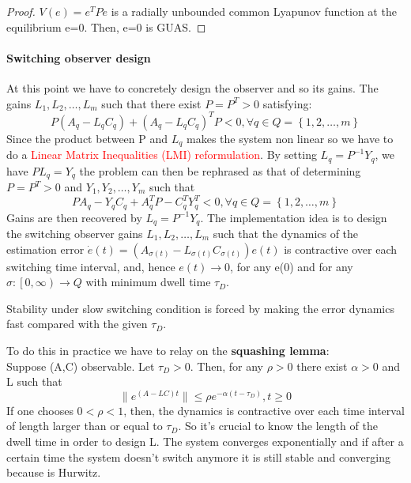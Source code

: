\begin{proof}
	 $V(e)=e^TPe$ is a radially unbounded common Lyapunov function at the equilibrium e=0. Then, e=0 is GUAS.
	\end{proof}
\paragraph{Switching observer design}
At this point we have to concretely design the observer and so its gains. The gains $L_1,L_2,\dots,L_m$ such that there exist $P=P^T>0$ satisfying: \[P(A_q-L_qC_q)+(A_q-L_qC_q)^TP<0, \forall q \in Q=\left\{1,2,\dots,m\right\}
\]
Since the product between P and $L_q$ makes the system non linear so we have to do a \textcolor{red}{Linear Matrix Inequalities (LMI) reformulation}.
By setting $L_q=P^{-1}Y_q$, we have $PL_q=Y_q$ the problem can then be rephrased as that of determining $P=P^T>0$ and $Y_1,Y_2,\dots,Y_m$ such that \[
PA_q-Y_qC_q+A_q^TP-C_q^TY_q^T<0, \forall q \in  Q =\left\{1,2,\dots,m\right\}
\]
Gains are then recovered by $L_q=P^{-1}Y_q$.
The implementation idea is to design the switching observer gains $L_1,L_2,\dots,L_m$ such that the dynamics of the estimation error $\dot{e}(t)=(A_{\sigma(t)}-L_{\sigma(t)}C_{\sigma(t)})e(t)$ is contractive over each switching time interval, and, hence $e(t)\to 0$, for any e(0) and for any $\sigma \colon \left[0,\infty\right)\to Q$ with minimum dwell time $\tau_D$.
\begin{remark}
	Stability under slow switching condition is forced by making the error dynamics fast compared with the given $\tau_D$.
\end{remark}
To do this in practice we have to relay on the \textbf{squashing lemma}:\\
Suppose (A,C) observable. Let $\tau_D>0$. Then, for any $\rho >0$ there exist $\alpha>0$ and L such that \[\|e^{(A-LC)t}\| \le \rho e^{-\alpha(t-\tau_D)}, t \ge 0\]
If one chooses $0<\rho<1$, then, the dynamics is contractive over each time interval of length larger than or equal to $\tau_D$. So it's crucial to know the length of the dwell time in order to design L. The system converges exponentially and if after a certain time the system doesn't switch anymore it is still stable and converging because is Hurwitz.
